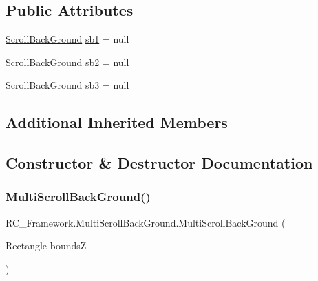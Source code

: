 \subsection*{Public Attributes}
\begin{DoxyCompactItemize}
\item 
\mbox{\hyperlink{class_r_c___framework_1_1_scroll_back_ground}{Scroll\+Back\+Ground}} \mbox{\hyperlink{class_r_c___framework_1_1_multi_scroll_back_ground_a20cc204c6f10652592dc1429e20d3a1e}{sb1}} = null
\item 
\mbox{\hyperlink{class_r_c___framework_1_1_scroll_back_ground}{Scroll\+Back\+Ground}} \mbox{\hyperlink{class_r_c___framework_1_1_multi_scroll_back_ground_a3d2a684350de4c4fbc262248cc6b8aff}{sb2}} = null
\item 
\mbox{\hyperlink{class_r_c___framework_1_1_scroll_back_ground}{Scroll\+Back\+Ground}} \mbox{\hyperlink{class_r_c___framework_1_1_multi_scroll_back_ground_ae010d29cb2cf4bd24b459679a37cd7a4}{sb3}} = null
\end{DoxyCompactItemize}
\subsection*{Additional Inherited Members}


\subsection{Constructor \& Destructor Documentation}
\mbox{\label{class_r_c___framework_1_1_multi_scroll_back_ground_a080400ff40d4fb293197930c6a76560e}} 
\subsubsection{\texorpdfstring{Multi\+Scroll\+Back\+Ground()}{MultiScrollBackGround()}}
{\footnotesize\ttfamily R\+C\+\_\+\+Framework.\+Multi\+Scroll\+Back\+Ground.\+Multi\+Scroll\+Back\+Ground (\begin{DoxyParamCaption}\item[{Rectangle}]{boundsZ }\end{DoxyParamCaption})}



